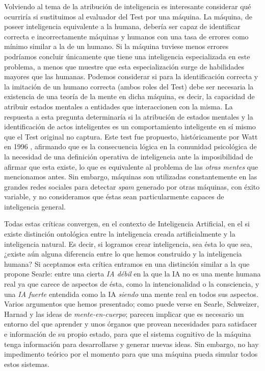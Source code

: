 \documentclass[12pt]{memoir}
\begin{document}
\nocite{newmind}

Volviendo al tema de la atribución de inteligencia es interesante considerar qué ocurriría si sustituimos al evaluador del Test por una máquina. La máquina, de poseer inteligencia equivalente a la humana, debería ser capaz de identificar correcta e incorrectamente máquinas y humanos con una tasa de errores como mínimo similar a la de un humano. Si la máquina tuviese menos errores podríamos concluir únicamente que tiene una inteligencia especializada en este problema, a menos que muestre que esta especialización surge de habilidades mayores que las humanas. Podemos considerar si para la identificación correcta y la imitación de un humano correcta (ambos roles del Test) debe ser necesaria la existencia de una teoría de la mente en dicha máquina, es decir, la capacidad de atribuir estados mentales a entidades que interaccionen con la misma. La respuesta a esta pregunta determinaría si la atribución de estados mentales y la identificación de actos inteligentes es un comportamiento inteligente en sí mismo que el Test original no captura. Este test fue propuesto, históricamente por Watt en 1996 \parencite[apartado 4.4.3]{afterTuring}, afirmando que es la consecuencia lógica en la comunidad psicológica de la necesidad de una definición operativa de inteligencia ante la imposibilidad de afirmar que esta existe, lo que es equivalente al problema de las \textit{otras mentes} que mencionamos antes. Sin embargo, máquinas son utilizadas constantemente en las grandes redes sociales para detectar \textit{spam} generado por otras máquinas, con éxito variable, y no consideramos que éstas sean particularmente capaces de inteligencia general.

Todas estas críticas convergen, en el contexto de Inteligencia Artificial, en el si existe distinción ontológica entre la inteligencia creada artificialmente y la inteligencia natural. Es decir, si logramos crear inteligencia, sea ésta lo que sea, ¿existe aún alguna diferencia entre lo que hemos construido y la inteligencia humana? Si aceptamos esta crítica entramos en una distinción similar a la que propone Searle: entre una cierta \textit{IA débil} en la que la IA no es una mente humana real ya que carece de aspectos de ésta, como la intencionalidad o la consciencia, y una \textit{IA fuerte} entendida como la IA \textit{siendo} una mente real en todos sus aspectos. Varios argumentos que hemos presentado; como puede verse en Searle, Schweizer, Harnad y las ideas de \textit{mente-en-cuerpo}; parecen implicar que es necesario un entorno del que aprender y unos órganos que provean necesidades para satisfacer e información de su propio estado, para que el sistema cognitivo de la máquina tenga información para desarrollarse y generar nuevas ideas. Sin embargo, no hay impedimento teórico por el momento para que una máquina pueda simular todos estos sistemas. 
\end{document}
